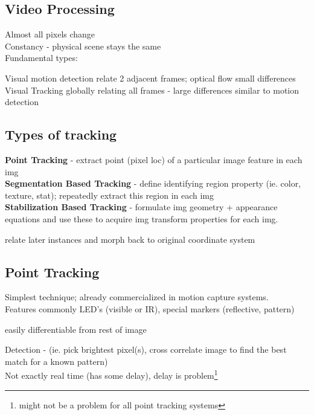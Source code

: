 \documentclass{article}
\begin{document}
\subsection{Video Processing}
Almost all pixels change\\
Constancy - physical scene stays the same
\\
Fundamental types:
\begin{outline}[enumerate]
    \1 Visual motion detection
        \2 relate 2 adjacent frames; optical flow
        \2 small differences
    \1 Visual Tracking
        \2 globally relating all frames - large differences    
        \2 similar to motion detection

\end{outline}

\subsection{Types of tracking}
\textbf{Point Tracking} - extract point (pixel loc) of a particular image feature in each img
\\
\textbf{Segmentation Based Tracking} - define identifying region property (ie. color, texture, stat); repeatedly extract this region in each img
\\
\textbf{Stabilization Based Tracking} - formulate img geometry + appearance equations and use these to 
acquire img transform properties for each img.
\begin{list}{}{}
    \item relate later instances and morph back to original coordinate system
\end{list}



\subsection{Point Tracking}
Simplest technique; already commercialized in motion capture systems. \\
Features commonly LED's (visible or IR), special markers (reflective, pattern)
\begin{list}{}{}
    \item easily differentiable from rest of image
\end{list}
Detection - (ie. pick brightest pixel(s), cross correlate image to find the best match for a known pattern)
\\
Not exactly real time (has some delay), delay is problem\footnote[1]{might not be a problem for all point tracking systems}
\end{document}
